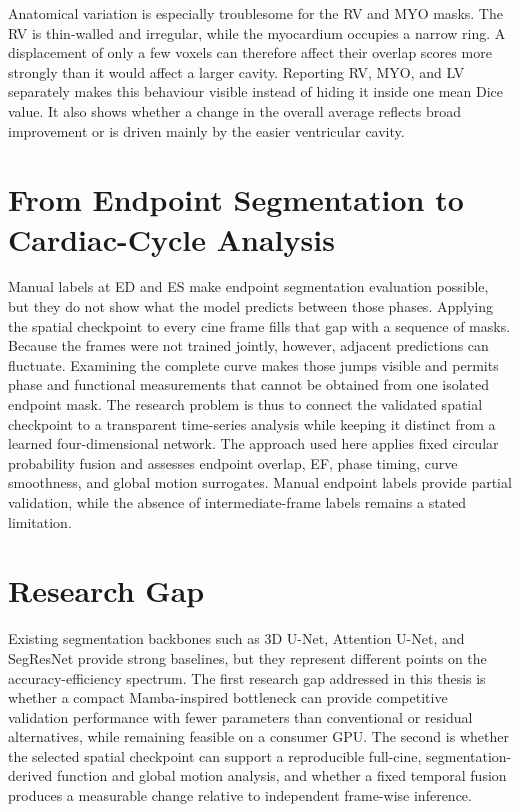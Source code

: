 Anatomical variation is especially troublesome for the RV and MYO masks. The RV is thin-walled and irregular, while the myocardium occupies a narrow ring. A displacement of only a few voxels can therefore affect their overlap scores more strongly than it would affect a larger cavity. Reporting RV, MYO, and LV separately makes this behaviour visible instead of hiding it inside one mean Dice value. It also shows whether a change in the overall average reflects broad improvement or is driven mainly by the easier ventricular cavity.

\section{From Endpoint Segmentation to Cardiac-Cycle Analysis}
Manual labels at ED and ES make endpoint segmentation evaluation possible, but they do not show what the model predicts between those phases. Applying the spatial checkpoint to every cine frame fills that gap with a sequence of masks. Because the frames were not trained jointly, however, adjacent predictions can fluctuate. Examining the complete curve makes those jumps visible and permits phase and functional measurements that cannot be obtained from one isolated endpoint mask. The research problem is thus to connect the validated spatial checkpoint to a transparent time-series analysis while keeping it distinct from a learned four-dimensional network. The approach used here applies fixed circular probability fusion and assesses endpoint overlap, EF, phase timing, curve smoothness, and global motion surrogates. Manual endpoint labels provide partial validation, while the absence of intermediate-frame labels remains a stated limitation.

\section{Research Gap}
Existing segmentation backbones such as 3D U-Net, Attention U-Net, and SegResNet provide strong baselines, but they represent different points on the accuracy-efficiency spectrum. The first research gap addressed in this thesis is whether a compact Mamba-inspired bottleneck can provide competitive validation performance with fewer parameters than conventional or residual alternatives, while remaining feasible on a consumer GPU. The second is whether the selected spatial checkpoint can support a reproducible full-cine, segmentation-derived function and global motion analysis, and whether a fixed temporal fusion produces a measurable change relative to independent frame-wise inference.


